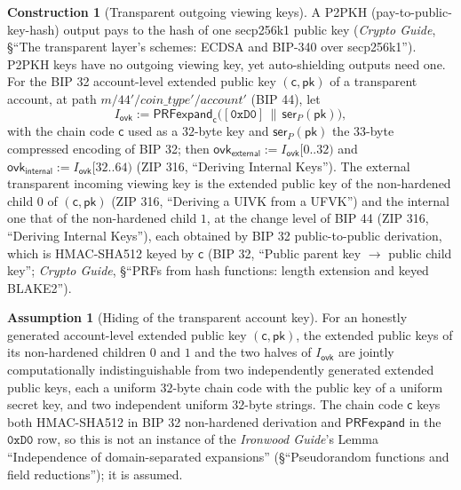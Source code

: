 \documentclass[11pt,a4paper]{article}
\theoremstyle{definition}
\newtheorem{construction}[theorem]{Construction}
\newtheorem{assumption}[theorem]{Assumption}
\newcommand{\ovk}{\ensuremath{\mathsf{ovk}}}
\begin{document}
\begin{construction}[Transparent outgoing viewing keys]\label{def:zip32-tovk}
A P2PKH (pay-to-public-key-hash) output pays to the hash of one secp256k1
public key (\emph{Crypto Guide}, \S``The transparent layer's schemes: ECDSA
and BIP-340 over secp256k1''). P2PKH keys have no outgoing viewing key, yet
auto-shielding outputs need one. For the BIP 32 account-level extended
public key $(\mathsf{c}, \mathsf{pk})$ of a transparent account, at path
$m / 44' / \mathit{coin\_type}' / \mathit{account}'$ (BIP 44), let
\[
  I_{\ovk} := \mathsf{PRFexpand}_{\mathsf{c}}\bigl([\mathtt{0xD0}] \,\|\,
    \mathsf{ser}_P(\mathsf{pk})\bigr),
\]
with the chain code $\mathsf{c}$ used as a $32$-byte key and
$\mathsf{ser}_P(\mathsf{pk})$ the $33$-byte compressed encoding of BIP 32;
then $\ovk_{\mathsf{external}} := I_{\ovk}[0..32)$ and
$\ovk_{\mathsf{internal}} := I_{\ovk}[32..64)$ (ZIP 316, ``Deriving
Internal Keys''). The external transparent incoming viewing key is the
extended public key of the non-hardened child $0$ of $(\mathsf{c},
\mathsf{pk})$ (ZIP 316, ``Deriving a UIVK from a UFVK'') and the internal one
that of the non-hardened child $1$, at the change level of BIP 44 (ZIP 316,
``Deriving Internal Keys''), each obtained by BIP 32 public-to-public
derivation, which is HMAC-SHA512 keyed by $\mathsf{c}$
(BIP 32, ``Public parent key $\to$ public child key''; \emph{Crypto Guide},
\S``PRFs from hash functions: length extension and keyed BLAKE2'').
\end{construction}

\begin{assumption}[Hiding of the transparent account key]%
\label{ass:zip32-bip32}
For an honestly generated account-level extended public key
$(\mathsf{c}, \mathsf{pk})$, the extended public keys of its non-hardened
children $0$ and $1$ and the two halves of $I_{\ovk}$ are jointly
computationally indistinguishable from two independently generated extended
public keys, each a uniform $32$-byte chain code with the public key of a
uniform secret key, and two independent uniform $32$-byte strings. The chain
code $\mathsf{c}$ keys both HMAC-SHA512 in BIP 32 non-hardened derivation
and $\mathsf{PRFexpand}$ in the $\mathtt{0xD0}$ row, so this is not an
instance of the \emph{Ironwood Guide}'s Lemma ``Independence of
domain-separated expansions'' (\S``Pseudorandom functions and field
reductions''); it is assumed.
\end{assumption}
\end{document}
